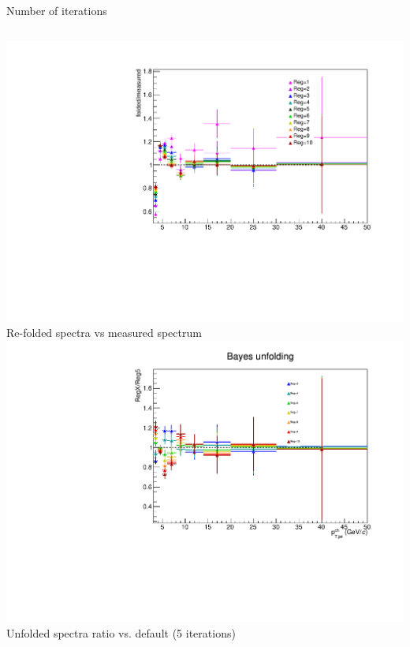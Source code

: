 \documentclass[xcolor={usenames,dvipsnames}, aspectratio=169]{beamer}
\begin{document}
\begin{frame}{Number of iterations}
\begin{columns}
\centering
\includegraphics[width=\textwidth]{img/pPb/PythiaRM_Djet5Excl_bayes5_weight_3_50_3_50_foldedRatio.pdf}\\
\small
Re-folded spectra vs measured spectrum
\centering
\includegraphics[width=\textwidth]{img/pPb/PythiaRM_Djet5Excl_bayes5_weight_3_50_3_50_unfRatio.pdf}\\
\small
Unfolded spectra ratio vs. default (5 iterations)
\end{columns}
\end{frame}
\end{document}
